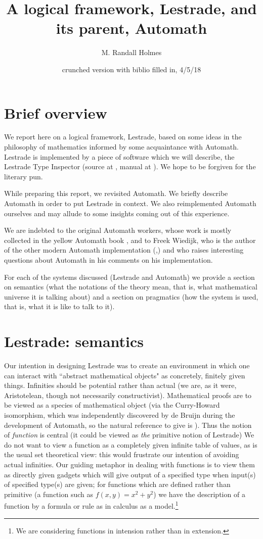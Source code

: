 \documentclass{article}
\title{A logical framework, Lestrade, and its parent, Automath}
\author{M. Randall Holmes}
\date{crunched version with biblio filled in, 4/5/18}
\begin{document}
\maketitle

\section{Brief overview}

We report here on a logical framework, Lestrade, based on some ideas in the philosophy of mathematics informed by some acquaintance with Automath.  Lestrade is implemented by a piece of software which we will describe, the Lestrade Type Inspector (source at \cite{lestradesource}, manual at \cite{lestrademanual}).  We hope to be forgiven for the literary pun.

While preparing this report, we revisited Automath.  We briefly describe Automath in order to put Lestrade in context.  We also reimplemented Automath ourselves and may allude to some insights coming out of this experience.

We are indebted to the original Automath workers, whose work is mostly collected in the yellow Automath book \cite{yellowbook}, and to Freek Wiedijk, who is the  author of the other modern Automath implementation (\cite{autmanual},\cite{autpaper}) and who raises  interesting questions about Automath in his comments on  his implementation.

For each of the systems discussed (Lestrade and Automath) we provide a section on semantics (what the notations of the theory mean, that is, what mathematical universe it is talking about) and a section on pragmatics (how the system is used, that is, what it is like to talk to it).

\section{Lestrade:  semantics}

 Our intention in designing Lestrade was to create an environment in which one can interact with ``abstract mathematical objects"  as concretely, finitely given things.  Infinities should be potential rather than actual (we are, as it were, Aristotelean, though not necessarily constructivist).  Mathematical proofs are to be viewed as a species of mathematical object (via the Curry-Howard isomorphism, which was independently discovered by de Bruijn during the development of Automath, so the natural reference to give is \cite{debruijna2}).  Thus the notion of {\em function\/} is central (it could be viewed as {\em the\/} primitive notion of Lestrade)  We do not want to view a function as a completely given infinite table of values, as is the usual set theoretical view:  this would frustrate our intention of avoiding actual infinities.  Our guiding metaphor in dealing with functions is to view them as directly given gadgets which will give output of a specified type when input(s) of specified type(s) are given;  for functions which are defined rather than primitive (a function such as $f(x,y)=x^2+y^2$) we have the description of a function by a formula or rule as in calculus as a model.\footnote{We are considering functions in intension rather than in extension.}
\end{document}
